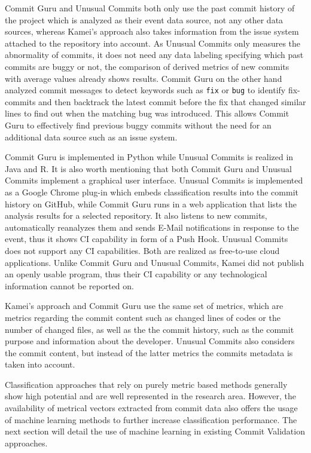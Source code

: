 Commit Guru and Unusual Commits both only use the past commit history of the project which is analyzed as their event data source, not any other data sources, whereas Kamei's approach also takes information from the issue system attached to the repository into account.
As Unusual Commits only measures the abnormality of commits, it does not need any data labeling specifying which past commits are buggy or not, the comparison of derived metrics of new commits with average values already shows results.
Commit Guru on the other hand analyzed commit messages to detect keywords such as \texttt{fix} or \texttt{bug} to identify fix-commits and then backtrack the latest commit before the fix that changed similar lines to find out when the matching bug was introduced. This allows Commit Guru to effectively find previous buggy commits without the need for an additional data source such as an issue system.

Commit Guru is implemented in Python while Unusual Commits is realized in Java and R. It is also worth mentioning that both Commit Guru and Unusual Commits implement a graphical user interface. Unusual Commits is implemented as a Google Chrome plug-in which embeds classification results into the commit history on GitHub, while Commit Guru runs in a web application that lists the analysis results for a selected repository. It also listens to new commits, automatically reanalyzes them and sends E-Mail notifications in response to the event, thus it shows CI capability in form of a Push Hook. Unusual Commits does not support any CI capabilities. Both are realized as free-to-use cloud applications.
Unlike Commit Guru and Unusual Commits, Kamei did not publish an openly usable program, thus their CI capability or any technological information cannot be reported on.

Kamei's approach and Commit Guru use the same set of metrics, which are metrics regarding the commit content such as changed lines of codes or the number of changed files, as well as the the commit history, such as the commit purpose and information about the developer. Unusual Commits also considers the commit content, but instead of the latter metrics the commits metadata is taken into account.

Classification approaches that rely on purely metric based methods generally show high potential and are well represented in the research area. However, the availability of metrical vectors extracted from commit data also offers the usage of machine learning methods to further increase classification performance. The next section will detail the use of machine learning in existing Commit Validation approaches.

